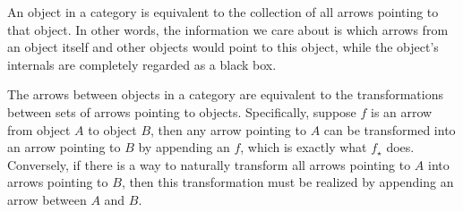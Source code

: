 An object in a category is equivalent to the collection of all arrows pointing to that object. In other words, the information we care about is which arrows from an object itself and other objects would point to this object, while the object's internals are completely regarded as a black box. 

The arrows between objects in a category are equivalent to the transformations between sets of arrows pointing to objects. Specifically, suppose $f$ is an arrow from object $A$ to object $B$, then any arrow pointing to $A$ can be transformed into an arrow pointing to $B$ by appending an $f$, which is exactly what $f_\star$ does. Conversely, if there is a way to naturally transform all arrows pointing to $A$ into arrows pointing to $B$, then this transformation must be realized by appending an arrow between $A$ and $B$.

